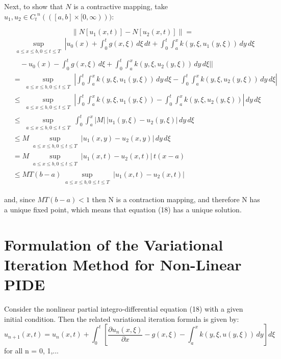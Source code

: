 \documentclass[12pt, a4paper]{report}
\begin{document}
Next, to show that \( N \) is a contractive mapping, take \( u_1, u_2 \in {C_t}^n(([a,b] \times [0,\infty))) \):

\[
\| N[u_1(x,t)] - N[u_2(x,t)] \| = 
\]
\[
\begin{array}{ll}
&\sup_{\substack{a \leq x \leq b , 0 \leq t \leq T}} \left| u_0(x) + \int_{0}^{t}  g(x,\xi) \, d\xi \, dt + \int_{0}^{t} \int_{a}^{x} k(y,\xi,u_1(y,\xi)) \, dy \, d\xi \right. \\
&\quad - u_0(x) - \int_{0}^{t} g(x,\xi) \, d\xi + \int_{0}^{t} \int_{a}^{x} k(y,\xi,u_2(y,\xi)) \, dy \, d\xi \left| \right| \\
&= \sup_{\substack{a \leq x \leq b , 0 \leq t \leq T}} \left| \int_{0}^{t} \int_{a}^{x} k(y,\xi,u_1(y,\xi)) \, dy \, d\xi - \int_{0}^{t} \int_{a}^{x} k(y,\xi,u_2(y,\xi)) \, dy \, d\xi \right|  \\
&\leq \sup_{\substack{a \leq x \leq b , 0 \leq t \leq T}} \left| \int_{0}^{t} \int_{a}^{x} k(y,\xi,u_1(y,\xi))  - \int_{0}^{t} \int_{a}^{x} k(y,\xi,u_2(y,\xi))\right| \, dy \, d\xi \\
& \leq \sup_{\substack{a \leq x \leq b , 0 \leq t \leq T}} \int_{0}^{t} \int_{a}^{x} |M| \, | u_1(y,\xi) - u_2(y,\xi) | \, dy \, d\xi \\
& \leq M \sup_{\substack{a \leq x \leq b ,0 \leq t \leq T}} | u_1(x,y) - u_2(x,y) | \, dy \, d\xi \\
& = M \sup_{\substack{a \leq x \leq b , 0 \leq t \leq T}} | u_1(x,t) - u_2(x,t) | \, t(x - a) \\
&\leq M T(b - a) \sup_{\substack{a \leq x \leq b , 0 \leq t \leq T}}| u_1(x,t) - u_2(x,t) |
\end{array}
\]



and, since $MT(b-a) < 1$  then N is a contraction mapping, and therefore N has a unique fixed point, which means that equation (18) has a unique solution.
\clearpage

\section{Formulation of the Variational Iteration Method for Non-Linear PIDE}

Consider the nonlinear partial integro-differential equation (18) with a given initial condition. Then the related variational iteration formula is given by:
\begin{equation}
    u_{n+1}(x,t) =  u_n(x,t) + \int_{0}^{t} \left[ \frac{\partial u_n(x,\xi)}{\partial x} - g(x,\xi) - \int_{a}^{x} k(y,\xi,u(y,\xi)) \, dy \right] d\xi
\end{equation}
for all n = 0, 1,...
\end{document}
